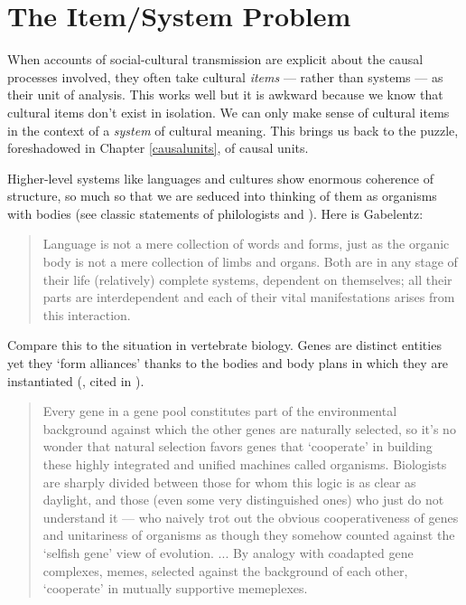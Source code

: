 
\chapter{The Item/System Problem}
\label{itemsystemproblem}


When accounts of social-cultural transmission are explicit about the 
causal processes involved, they often take cultural \textit{items} --- rather than systems --- as their unit of analysis. This works well 
but it is awkward because we know that cultural items don't exist in 
isolation. We can only make sense of cultural items in the context of a 
\textit{system} of cultural meaning. This brings us back to the puzzle, foreshadowed in Chapter \ref{causalunits}, of causal units. 



Higher-level systems like languages and cultures show enormous coherence 
of structure, so much so that we are seduced into thinking of them as organisms with 
bodies (see classic statements of philologists \citealt{gabelentz_sprachwissenschaft_1891} and \citealt[16]{meillet_linguistique_1926}). Here is Gabelentz:

\begin{quotation}
Language is not a mere collection of words and forms, just as the organic body is not a mere collection of limbs and organs. Both are in any stage of their life (relatively) complete systems, dependent on themselves; all their parts are interdependent and each of their vital manifestations arises from this interaction. \citep[10]{gabelentz_sprachwissenschaft_1891}
\end{quotation}

Compare this to the situation in vertebrate 
biology. Genes are distinct entities yet they \textquoteleft form 
alliances' thanks to the bodies and body plans in which they are 
instantiated (\citealt{gould_ontogeny_1977}, cited in \citealt[117]{dawkins_extended_1982}). 

\begin{quotation}
Every gene in a gene pool constitutes part of the environmental background against which the other genes are naturally selected, so it's no wonder that natural selection favors genes that `cooperate' in building these highly integrated and unified machines called organisms.  Biologists are sharply divided between those for whom this logic is as clear as daylight, and those (even some very distinguished ones) who just do not understand it --- who naively trot out the obvious cooperativeness of genes and unitariness of organisms as though they somehow counted against the `selfish gene' view of evolution. ... By analogy with coadapted gene complexes, memes, selected against the background of each other, `cooperate' in mutually supportive memeplexes. \citep[xv]{DawkinsMemeForeword1999}
\end{quotation}

